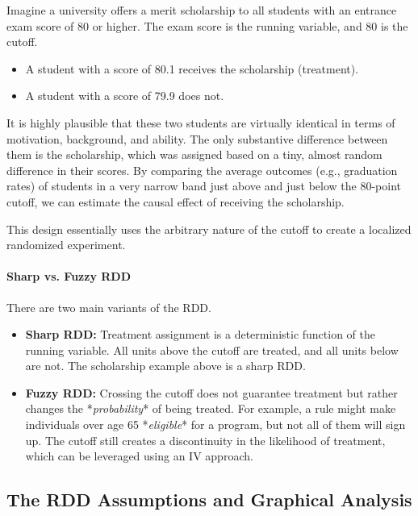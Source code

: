 \documentclass{article}
\providecommand{\tightlist}{
  \setlength{\itemsep}{0pt}
  \setlength{\parskip}{0pt}}
\begin{document}
Imagine a university offers a merit scholarship to all students with an entrance exam score of 80 or higher. The exam score is the running variable, and 80 is the cutoff.
\begin{itemize}
    \tightlist
    \item A student with a score of 80.1 receives the scholarship (treatment).
    \item A student with a score of 79.9 does not.
\end{itemize}
It is highly plausible that these two students are virtually identical in terms of motivation, background, and ability. The only substantive difference between them is the scholarship, which was assigned based on a tiny, almost random difference in their scores. By comparing the average outcomes (e.g., graduation rates) of students in a very narrow band just above and just below the 80-point cutoff, we can estimate the causal effect of receiving the scholarship.

This design essentially uses the arbitrary nature of the cutoff to create a localized randomized experiment.

\paragraph{Sharp vs. Fuzzy RDD}
There are two main variants of the RDD.
\begin{itemize}
    \tightlist
    \item \textbf{Sharp RDD:} Treatment assignment is a deterministic function of the running variable. All units above the cutoff are treated, and all units below are not. The scholarship example above is a sharp RDD.
    \item \textbf{Fuzzy RDD:} Crossing the cutoff does not guarantee treatment but rather changes the *\textit{probability}* of being treated. For example, a rule might make individuals over age 65 *\textit{eligible}* for a program, but not all of them will sign up. The cutoff still creates a discontinuity in the likelihood of treatment, which can be leveraged using an IV approach.
\end{itemize}

\subsection{The RDD Assumptions and Graphical Analysis}
\label{sub:rdd_assumptions}
\end{document}
